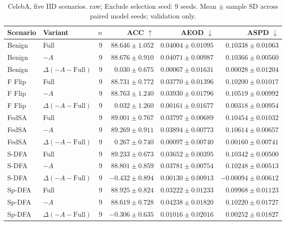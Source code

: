 \begin{table}[t]
\centering
\small
\caption{CelebA, five IID scenarios. raw; Exclude selection seed: 9 seeds. Mean $\pm$ sample SD across paired model seeds; validation only.}
\begin{tabular}{llrrrr}
\toprule
Scenario & Variant & $n$ & ACC $\uparrow$ & AEOD $\downarrow$ & ASPD $\downarrow$ \\
\midrule
Benign & Full & 9 & $88.646 \pm 1.052$ & $0.04004 \pm 0.01095$ & $0.10338 \pm 0.01063$ \\
Benign & $-A$ & 9 & $88.676 \pm 0.910$ & $0.04071 \pm 0.00987$ & $0.10366 \pm 0.00560$ \\
Benign & $\Delta(-A-\mathrm{Full})$ & 9 & $0.030 \pm 0.675$ & $0.00067 \pm 0.01631$ & $0.00028 \pm 0.01204$ \\
F Flip & Full & 9 & $88.731 \pm 0.772$ & $0.03770 \pm 0.01396$ & $0.10200 \pm 0.01017$ \\
F Flip & $-A$ & 9 & $88.763 \pm 1.240$ & $0.03930 \pm 0.01796$ & $0.10519 \pm 0.00992$ \\
F Flip & $\Delta(-A-\mathrm{Full})$ & 9 & $0.032 \pm 1.260$ & $0.00161 \pm 0.01677$ & $0.00318 \pm 0.00954$ \\
FedSA & Full & 9 & $89.001 \pm 0.767$ & $0.03797 \pm 0.00689$ & $0.10454 \pm 0.01032$ \\
FedSA & $-A$ & 9 & $89.269 \pm 0.911$ & $0.03894 \pm 0.00773$ & $0.10614 \pm 0.00657$ \\
FedSA & $\Delta(-A-\mathrm{Full})$ & 9 & $0.267 \pm 0.740$ & $0.00097 \pm 0.00740$ & $0.00160 \pm 0.00741$ \\
S-DFA & Full & 9 & $89.233 \pm 0.673$ & $0.03652 \pm 0.00395$ & $0.10342 \pm 0.00500$ \\
S-DFA & $-A$ & 9 & $88.801 \pm 0.859$ & $0.03781 \pm 0.00754$ & $0.10248 \pm 0.00513$ \\
S-DFA & $\Delta(-A-\mathrm{Full})$ & 9 & $-0.432 \pm 0.894$ & $0.00130 \pm 0.00913$ & $-0.00094 \pm 0.00612$ \\
Sp-DFA & Full & 9 & $88.925 \pm 0.824$ & $0.03222 \pm 0.01233$ & $0.09968 \pm 0.01123$ \\
Sp-DFA & $-A$ & 9 & $88.619 \pm 0.728$ & $0.04238 \pm 0.01820$ & $0.10220 \pm 0.01727$ \\
Sp-DFA & $\Delta(-A-\mathrm{Full})$ & 9 & $-0.306 \pm 0.635$ & $0.01016 \pm 0.02016$ & $0.00252 \pm 0.01827$ \\
\bottomrule
\end{tabular}
\end{table}

